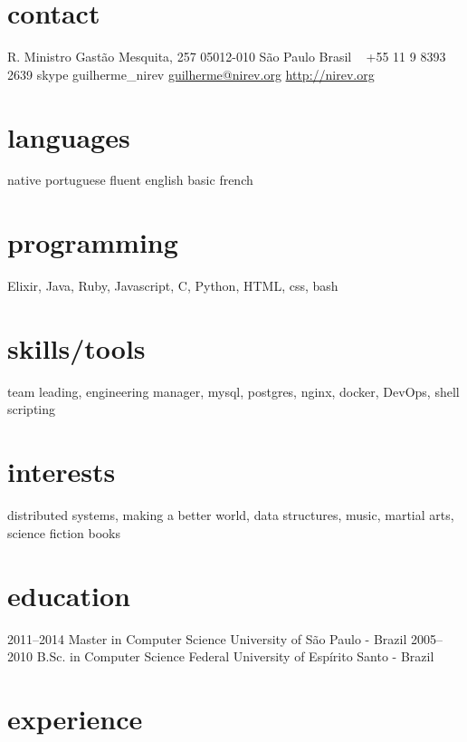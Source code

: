 \documentclass{friggeri-cv}
\begin{document}
       {}

\begin{aside}
  \section{contact}
    R. Ministro Gastão Mesquita, 257
    05012-010 São Paulo
    Brasil
    ~
    +55 11 9 8393 2639
    {\footnotesize skype} guilherme\_nirev
    \href{mailto:guilherme@nirev.org}{guilherme@nirev.org}
    \href{http://nirev.org}{http://nirev.org}
  \section{languages}
    native portuguese
    fluent english
    basic french
  \section{programming}
    Elixir, Java, Ruby, Javascript, C, Python,
    HTML, css, bash
  \section{skills/tools}
    team leading, engineering manager,
    mysql, postgres,
    nginx, docker, DevOps,
    shell scripting
  \section{interests}
distributed systems, making a better world, data structures, music, martial arts, science fiction books
\end{aside}


\section{education}

\begin{entrylist}

\entry
  {2011–2014}
  {Master in Computer Science}
  {University of São Paulo - Brazil}{}
\entry
  {2005–2010}
  {B.Sc. in Computer Science}
  {Federal University of Espírito Santo - Brazil}{}
\end{entrylist}

\section{experience}
\end{document}
